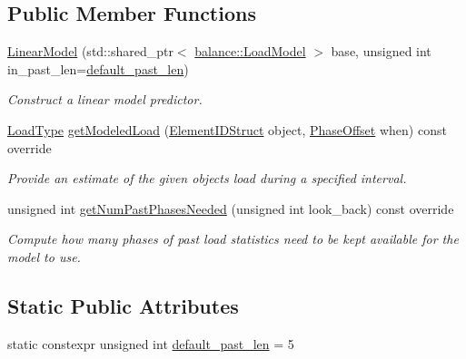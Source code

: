 \subsection*{Public Member Functions}
\begin{DoxyCompactItemize}
\item 
\hyperlink{structvt_1_1vrt_1_1collection_1_1balance_1_1_linear_model_a90fff488014731417431b35295a263d7}{Linear\+Model} (std\+::shared\+\_\+ptr$<$ \hyperlink{structvt_1_1vrt_1_1collection_1_1balance_1_1_load_model}{balance\+::\+Load\+Model} $>$ base, unsigned int in\+\_\+past\+\_\+len=\hyperlink{structvt_1_1vrt_1_1collection_1_1balance_1_1_linear_model_a5735a20dfd17fb2804a1b9b90d5649d1}{default\+\_\+past\+\_\+len})
\begin{DoxyCompactList}\small\item\em Construct a linear model predictor. \end{DoxyCompactList}\item 
\hyperlink{namespacevt_a8fb51741340b87d7aaee0bef60e9896b}{Load\+Type} \hyperlink{structvt_1_1vrt_1_1collection_1_1balance_1_1_linear_model_a7930cdc6b81ebcc2143a80ad6b72e541}{get\+Modeled\+Load} (\hyperlink{namespacevt_1_1vrt_1_1collection_1_1balance_a9f5b53fafb270212279a4757d2c4cd28}{Element\+I\+D\+Struct} object, \hyperlink{structvt_1_1vrt_1_1collection_1_1balance_1_1_phase_offset}{Phase\+Offset} when) const override
\begin{DoxyCompactList}\small\item\em Provide an estimate of the given object\textquotesingle{}s load during a specified interval. \end{DoxyCompactList}\item 
unsigned int \hyperlink{structvt_1_1vrt_1_1collection_1_1balance_1_1_linear_model_ae1a9d609a834df8d672992de8184e458}{get\+Num\+Past\+Phases\+Needed} (unsigned int look\+\_\+back) const override
\begin{DoxyCompactList}\small\item\em Compute how many phases of past load statistics need to be kept available for the model to use. \end{DoxyCompactList}\end{DoxyCompactItemize}
\subsection*{Static Public Attributes}
\begin{DoxyCompactItemize}
\item 
static constexpr unsigned int \hyperlink{structvt_1_1vrt_1_1collection_1_1balance_1_1_linear_model_a5735a20dfd17fb2804a1b9b90d5649d1}{default\+\_\+past\+\_\+len} = 5
\end{DoxyCompactItemize}
